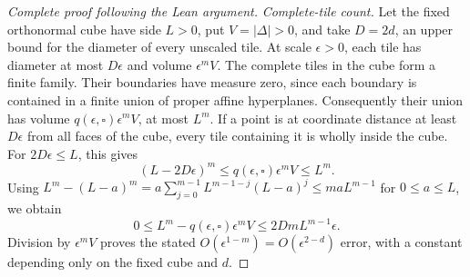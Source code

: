 \begin{proof}[Complete proof following the Lean argument]
\emph{Complete-tile count.}
Let the fixed orthonormal cube have side \(L>0\), put \(V=|\Delta|>0\),
and take \(D=2d\), an upper bound for the diameter of every unscaled tile.
At scale \(\epsilon>0\), each tile has diameter at most \(D\epsilon\)
and volume \(\epsilon^m V\).
The complete tiles in the cube form a finite family.
Their boundaries have measure zero, since each boundary is contained in a
finite union of proper affine hyperplanes. Consequently their union has
volume \(q(\epsilon,\square)\epsilon^m V\), at most \(L^m\).
If a point is at coordinate distance at least \(D\epsilon\) from all
faces of the cube, every tile containing it is wholly inside the cube.
For \(2D\epsilon\le L\), this gives
\[
 (L-2D\epsilon)^m
       \le q(\epsilon,\square)\epsilon^m V\le L^m.
\]
Using
\(L^m-(L-a)^m
 =a\sum_{j=0}^{m-1}L^{m-1-j}(L-a)^j\le maL^{m-1}\)
for \(0\le a\le L\), we obtain
\[
 0\le L^m-q(\epsilon,\square)\epsilon^m V
       \le 2DmL^{m-1}\epsilon.
\]
Division by \(\epsilon^m V\) proves the stated
\(O(\epsilon^{1-m})=O(\epsilon^{2-d})\) error, with a constant depending
only on the fixed cube and \(d\).
\end{proof}

